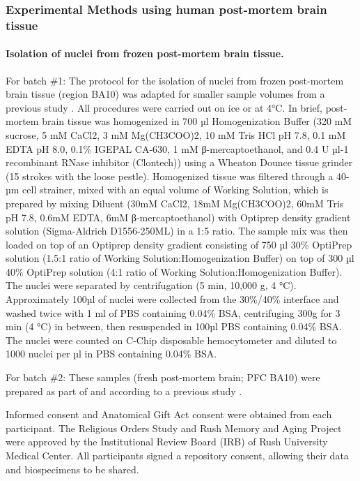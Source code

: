 \subsubsection{Experimental Methods using human post-mortem brain tissue}

\paragraph{Isolation of nuclei from frozen post-mortem brain tissue.}
For batch \#1: The protocol for the isolation of nuclei from frozen post-mortem brain tissue (region BA10) was adapted for smaller sample volumes from a previous study \cite{Mathys2019-dl}. All procedures were carried out on ice or at 4°C. In brief, post-mortem brain tissue was homogenized in 700 µl Homogenization Buffer (320 mM sucrose, 5 mM CaCl2, 3 mM Mg(CH3COO)2, 10 mM Tris HCl pH 7.8, 0.1 mM EDTA pH 8.0, 0.1\% IGEPAL CA-630, 1 mM β-mercaptoethanol, and 0.4 U µl-1 recombinant RNase inhibitor (Clontech)) using a Wheaton Dounce tissue grinder (15 strokes with the loose pestle). Homogenized tissue was filtered through a 40-µm cell strainer, mixed with an equal volume of Working Solution, which is prepared by mixing Diluent (30mM CaCl2, 18mM Mg(CH3COO)2, 60mM Tris pH 7.8, 0.6mM EDTA, 6mM β-mercaptoethanol) with Optiprep density gradient solution (Sigma-Aldrich D1556-250ML) in a 1:5 ratio. The sample mix was then loaded on top of an Optiprep density gradient consisting of 750 µl 30\% OptiPrep solution (1.5:1 ratio of Working Solution:Homogenization Buffer) on top of 300 µl 40\% OptiPrep solution (4:1 ratio of Working Solution:Homogenization Buffer). The nuclei were separated by centrifugation (5 min, 10,000 g, 4 °C). Approximately 100µl of nuclei were collected from the 30\%/40\% interface and washed twice with 1 ml of PBS containing 0.04\% BSA, centrifuging 300g for 3 min (4 °C) in between, then resuspended in 100µl PBS containing 0.04\% BSA. The nuclei were counted on C-Chip disposable hemocytometer and diluted to 1000 nuclei per µl in PBS containing 0.04\% BSA. 

For batch \#2: These samples (fresh post-mortem brain; PFC BA10) were prepared as part of and according to a previous study \cite{Mathys2019-dl}.

Informed consent and Anatomical Gift Act consent were obtained from each participant. The Religious Orders Study and Rush Memory and Aging Project were approved by the Institutional Review Board (IRB) of Rush University Medical Center. All participants signed a repository consent, allowing their data and biospecimens to be shared.

